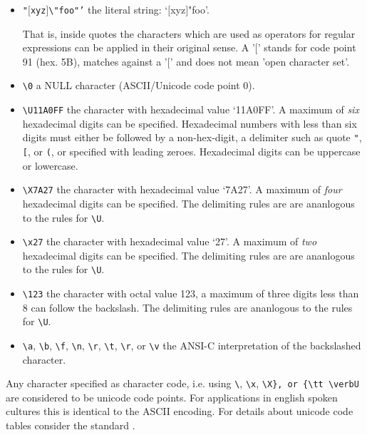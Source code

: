 \begin{itemize}
\item {\tt "$[$xyz$]$\verb|\|"foo"'} the literal string: `$[$xyz$]$"foo'.
    
     That is, inside quotes the characters which are used as operators for
     regular expressions can be applied in their original sense. A '$[$'
     stands for code point 91 (hex. 5B), matches against a '$[$' and does
     not mean 'open character set'.     
	  
\item {\tt \verb|\|0} a NULL character (ASCII/Unicode code point 0).

\item {\tt \verb|\|U11A0FF} the character with hexadecimal value `11A0FF'. A
      maximum of {\it six} hexadecimal digits can be specified.  Hexadecimal numbers
      with less than six digits must either be followed by a non-hex-digit, a 
      delimiter such as quote \verb|"|, \verb|[|, or \verb|(|, or specified with leading
      zeroes. Hexadecimal digits can be uppercase or lowercase.

\item {\tt \verb|\|X7A27} the character with hexadecimal value `7A27'. A
      maximum of {\it four} hexadecimal digits can be specified. The
      delimiting rules are are ananlogous to the rules for {\tt \verb|\|U}. 

\item {\tt \verb|\|x27} the character with hexadecimal value `27'. A maximum
     of {\it two} hexadecimal digits can be specified. The
      delimiting rules are are ananlogous to the rules for {\tt \verb|\|U}. 

\item {\tt \verb|\|123} the character with octal value 123, a maximum of three
     digits less than 8 can follow the backslash. The
      delimiting rules are ananlogous to the rules for {\tt \verb|\|U}. 


\item {\tt \verb|\|a}, {\tt \verb|\|b}, {\tt \verb|\|f}, {\tt \verb|\|n}, 
      {\tt \verb|\|r}, {\tt \verb|\|t}, {\tt \verb|\|r}, or {\tt \verb|\|v}
     the ANSI-C interpretation of the backslashed character.

\end{itemize}

Any character specified as character code, i.e. using {\tt \verb|\|}, 
{\tt \verb|\x|}, {\tt \verb|\X}, or {\tt \verb|U} are considered to be unicode
code points. For applications in english spoken cultures this is identical to
the ASCII encoding. For details about unicode code tables consider the
standard \cite{Unicode50}.

